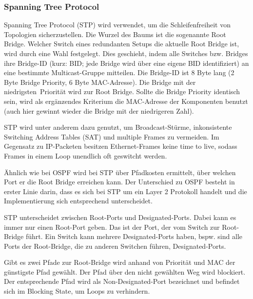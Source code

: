 \subsubsection{Spanning Tree Protocol}

Spanning Tree Protocol (STP) wird verwendet, um die Schleifenfreiheit von Topologien sicherzustellen. Die Wurzel des Baums ist die sogenannte Root Bridge. Welcher Switch eines redundanten Setups die aktuelle Root Bridge ist, wird durch eine Wahl festgelegt. Dies geschieht, indem alle Switches bzw. Bridges ihre Bridge-ID (kurz: BID; jede Bridge wird über eine eigene BID identifiziert) an eine bestimmte Multicast-Gruppe mitteilen. Die Bridge-ID ist 8 Byte lang (2 Byte Bridge Priority, 6 Byte MAC-Adresse). Die Bridge mit der \ql niedrigsten\qr\ Priorität wird zur Root Bridge. Sollte die Bridge Priority identisch sein, wird als ergänzendes Kriterium die MAC-Adresse der Komponenten benutzt (auch hier gewinnt wieder die Bridge mit der niedrigeren Zahl).

STP wird unter anderem dazu genutzt, um Broadcast-Stürme, inkonsistente Switching Address Tables (SAT) und multiple Frames zu vermeiden. Im Gegensatz zu IP-Packeten besitzen Ethernet-Frames keine time to live, sodass
Frames in einem Loop unendlich oft geswitcht werden.

Ähnlich wie bei OSPF wird bei STP über Pfadkosten ermittelt, über welchen Port er die Root Bridge erreichen kann. Der Unterschied zu OSPF besteht in erster Linie darin, dass es sich bei STP um ein Layer 2 Protokoll handelt und die Implementierung sich entsprechend unterscheidet.

STP unterscheidet zwischen Root-Ports und Designated-Ports. Dabei kann es immer nur einen Root-Port geben. Das ist der Port, der vom Switch zur Root-Bridge führt. Ein Switch kann mehrere Designated-Ports haben, bspw. sind alle Ports der Root-Bridge, die zu anderen Switchen führen, Designated-Ports.

Gibt es zwei Pfade zur Root-Bridge wird anhand von Priorität und MAC der günstigste Pfad gewählt. Der Pfad über den nicht gewählten Weg wird blockiert. Der entsprechende Pfad wird als Non-Designated-Port bezeichnet und befindet sich im Blocking State, um Loops zu verhindern.

